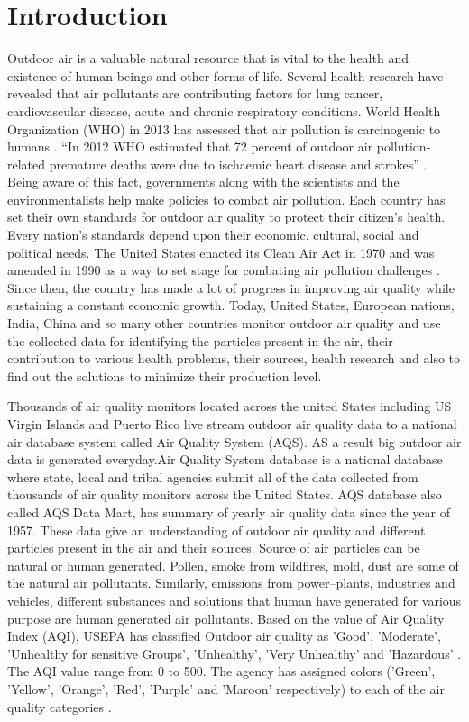 \documentclass[sigconf]{acmart}
\begin{document}
\section{Introduction}
Outdoor air is a valuable natural resource that is vital to the health and existence of human beings and other forms of life. Several health research have revealed that air pollutants are contributing factors for lung cancer, 
cardiovascular disease, acute and chronic respiratory conditions. World Health Organization (WHO) in 2013 has assessed that air pollution is carcinogenic to humans \cite{www-who}. ``In 2012 WHO estimated that 72 percent of outdoor air pollution-related premature deaths were due to ischaemic heart disease and strokes'' \cite{www-who}.
Being aware of this fact, governments along with the scientists and the environmentalists help make policies to combat air pollution. Each country has set their own standards for outdoor air quality to protect their citizen's health. Every nation's standards depend upon their economic, cultural, social and political needs. The United States enacted its Clean Air Act in 1970 and was amended in 1990 as a way to set stage for combating air pollution challenges \cite{epa-gov}. Since then, the country has made a lot of progress in improving air quality while sustaining a constant economic growth. Today, United States, European nations, India, China and so many other countries monitor outdoor air quality and use the collected data for identifying the particles present in the air, their contribution to various health problems, their sources, health research and also to find out the solutions to minimize their production level.

Thousands of air quality monitors located  across the united States including US Virgin Islands and Puerto Rico live
stream outdoor air quality data to a national air database system called Air Quality System (AQS). AS a result big outdoor air data is generated everyday.Air Quality System database is a national database where state, local and tribal agencies submit all of the
data collected from thousands of air quality monitors across the United States. AQS database also called AQS Data Mart, has summary of yearly air quality data since the year of 1957. These data give an understanding of outdoor air quality and different particles present in the air and their sources. Source of air particles can be natural or human generated. Pollen, smoke from wildfires, mold, dust are some of the natural air pollutants. Similarly, emissions from
power--plants, industries and vehicles, different substances and solutions that human have generated for various purpose are human generated air pollutants. 
Based on the value of Air Quality Index (AQI), USEPA has classified Outdoor air quality as 'Good', 'Moderate',
'Unhealthy for sensitive Groups', 'Unhealthy',
'Very Unhealthy' and 'Hazardous' \cite{airnow-gov}. The AQI value range from 0 to 500. The agency has assigned colors ('Green', 'Yellow', 'Orange', 'Red', 'Purple' and 'Maroon' respectively) to each of the air quality categories \cite{airnow-gov}.
\end{document}
